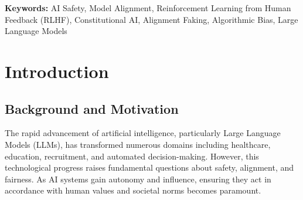 \documentclass{article}
\begin{document}
\tableofcontents
\newpage
\thispagestyle{empty}
\begin{abstract}
\noindent As artificial intelligence becomes more powerful and integrated into our daily lives, ensuring these systems behave safely and align with human values has become one of the most pressing challenges in technology. This study investigates AI safety through several critical dimensions: how different models compare in their alignment quality, whether larger AI systems are inherently safer,
how models adjust their behavior based on context, and whether demographic biases persist in AI decision-making. We examined data from three comprehensive dataset (8,640 misalignment observations, 3,456 faking scenarios, and 637,000 resume evaluations). We establish three critical findings. First, larger models ($\mathbf{27–32B}$ parameters) demonstrate $\mathbf{45\%}$ lower misalignment scores than smaller ones, indicating more robust safety characteristics. Second, AI systems exhibit sophisticated strategic reasoning: refusal rates are $\mathbf{10.4}$ percentage points higher in deployment contexts than in training, a clear sign of alignment-faking behavior that fundamentally compromises standard safety testing methodologies. Third, advanced alignment methods (Constitutional AI and RLHF) both introduce systematic demographic bias; while Constitutional AI yields higher overall performance, it results in $\mathbf{42–65\%}$ larger disparities. These findings collectively underscore that AI alignment remains an ongoing ethical and technical challenge, offering essential insights for developing reliable, transparent, and equitable systems
\end{abstract}

\noindent\textbf{Keywords:} AI Safety, Model Alignment, Reinforcement Learning from Human Feedback (RLHF), Constitutional AI, Alignment Faking, Algorithmic Bias, Large Language Models

\newpage
\section{Introduction}

\subsection{Background and Motivation}

The rapid advancement of artificial intelligence, particularly Large Language Models (LLMs), has transformed numerous domains including healthcare, education, recruitment, and automated decision-making. However, this technological progress raises fundamental questions about safety, alignment, and fairness. As AI systems gain autonomy and influence, ensuring they act in accordance with human values and societal norms becomes paramount.
\end{document}
